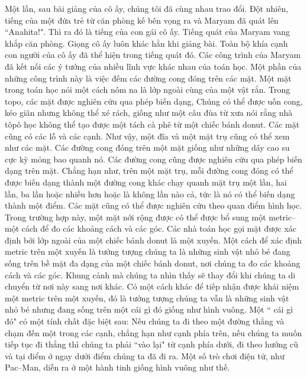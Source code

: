 \begin{multicols}{2}
	\vskip 0.1cm
	Một lần, sau bài giảng của cô ấy, chúng tôi đã cùng nhau trao đổi. Đột nhiên, tiếng của một đứa trẻ từ căn phòng kế bên vọng ra và Maryam đã quát lên ``Anahita!". Thì ra đó là tiếng của con gái cô ấy. Tiếng quát của \linebreak Maryam vang khắp căn phòng. Giọng cô ấy luôn khác hẳn khi giảng bài. Toàn bộ {\color[named]{codienhiendai}khía cạnh con người} của cô ấy đã thể hiện trong tiếng quát đó.
	\vskip 0.1cm
	Các công trình của Maryam đã kết nối các ý tưởng của nhiều lĩnh vực khác nhau của toán học. Một phần của những công trình này là việc đếm các đường cong đóng trên các  mặt. Một mặt trong toán học nói một cách nôm na là lớp ngoài cùng của một vật rắn. Trong topo, các mặt được nghiên cứu qua phép biến dạng, Chúng có thể được uốn cong, {\color[named]{codienhiendai}kéo giãn} nhưng không thể xé rách, giống như {\color[named]{codienhiendai}một câu đùa từ xưa nói} rằng nhà tôpô học không thể tạo được một tách cà phê từ một chiếc bánh donut. Các mặt cũng có các lỗ và các cạnh. Như vậy, một đĩa và một mặt trụ cũng có thể xem như các mặt. 
	\vskip 0.1cm
	Các đường cong đóng trên một mặt giống như những dây cao su cực kỳ mỏng bao \linebreak quanh nó. Các đường cong cũng được nghiên cứu qua phép biến dạng trên mặt. Chẳng hạn như, trên một mặt trụ, mỗi đường cong đóng có thể được biến dạng \linebreak thành một đường cong khác chạy quanh mặt trụ một lần, hai lần, ba lần hoặc nhiều hơn hoặc là không lần nào cả, tức là nó có thể biến dạng thành một điểm.
	\vskip 0.1cm
	Các mặt cũng có thể được nghiên cứu theo quan điểm hình học. Trong trường hợp này, một mặt nới rộng được có thể được bổ sung một metric--một cách để đo các khoảng cách và các góc.
	\vskip 0.1cm
	Các nhà toán học gọi mặt được xác định bởi lớp ngoài của một chiếc bánh donut là một xuyến. Một cách để xác định metric trên một xuyến là tưởng tượng chúng ta là những \linebreak sinh vật nhỏ bé đang sống trên bề mặt đa dạng của một chiếc bánh donut, nơi chúng ta đo các khoảng cách và các góc. Khung cảnh mà chúng ta nhìn thấy sẽ thay đổi khi chúng ta di chuyển từ nơi này sang nơi khác. 
	\vskip 0.1cm
	Có một cách khác để {\color[named]{codienhiendai}tiếp nhận được khái niệm}  một metric trên một xuyến, đó là tưởng tượng chúng ta vẫn là những sinh vật nhỏ bé nhưng đang sống trên một cái gì đó giống như hình vuông. Một `` cái gì đó" có một \linebreak tính chất đặc biệt sau: Nếu chúng ta đi theo một đường thẳng và {\color[named]{codienhiendai}chạm} đến một trong các \linebreak cạnh, chẳng hạn như cạnh phía trên, nếu chúng ta muốn tiếp tục đi thẳng thì chúng ta phải ``vào lại" từ cạnh phía dưới, đi theo hướng cũ và tại điểm ở ngay dưới điểm chúng ta đã đi ra. Một số trò chơi điện tử, như Pac--Man, diễn ra ở một hành tinh giống hình vuông như thế.

\end{multicols}
